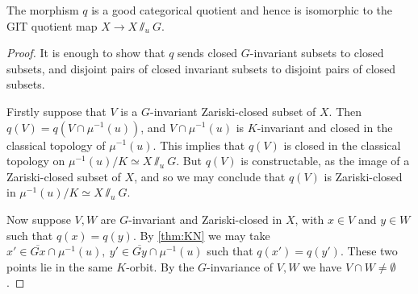 \begin{lemma}\label{lem:catquot}
The morphism \(q\) is a good categorical quotient and hence is isomorphic to the GIT quotient map \(X \to X\sslash_u G\).
\end{lemma}
%
%
%
\begin{proof}
It is enough to show that \(q\) sends closed \(G\)-invariant subsets to closed subsets, and disjoint pairs of closed invariant subsets to disjoint pairs of closed subsets.

Firstly suppose that \(V\) is a  \(G\)-invariant Zariski-closed subset of \(X\). Then \(q(V) = q(V \cap \mu^{-1}(u))\), and \(V \cap \mu^{-1}(u)\) is \(K\)-invariant and closed in the classical topology of \(\mu^{-1}(u)\). This implies that \(q(V)\) is closed in the classical topology on \(\mu^{-1}(u)/K \simeq X\sslash_u G\). But \(q(V)\) is constructable, as the image of a Zariski-closed subset of \(X\), and so we may conclude that \(q(V)\) is Zariski-closed in \(\mu^{-1}(u)/K \simeq X\sslash_u G\).

Now suppose \(V,W\) are \(G\)-invariant and Zariski-closed in \(X\), with \(x \in V\) and \(y \in W\) such that \(q(x) = q(y)\). By \ref{thm:KN} we may take \({x'} \in \overline{Gx} \cap \mu^{-1}(u), \ {y'} \in \overline{Gy} \cap \mu^{-1}(u)\) such that \(q({x'}) = q({y'})\). These two points lie in the same \(K\)-orbit. By the \(G\)-invariance of \(V,W\) we have \(V \cap W \neq \emptyset\).
\end{proof}
%
%
%
%
%
%
